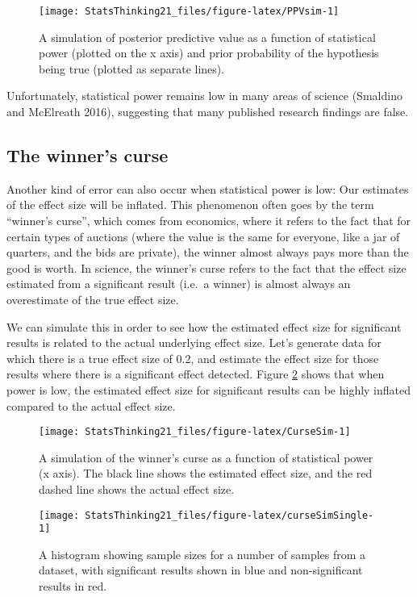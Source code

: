 \documentclass[]{book}
\theoremstyle{definition}
\theoremstyle{definition}
\theoremstyle{definition}
\theoremstyle{remark}
\begin{document}
\begin{figure}
\texttt{[image: StatsThinking21\_files/figure-latex/PPVsim-1]} \caption{A simulation of posterior predictive value as a function of statistical power (plotted on the x axis) and prior probability of the hypothesis being true (plotted as separate lines).}\label{fig:PPVsim}
\end{figure}

Unfortunately, statistical power remains low in many areas of science
(Smaldino and McElreath 2016), suggesting that many published research
findings are false.

\subsection{The winner's curse}\label{the-winners-curse}

Another kind of error can also occur when statistical power is low: Our
estimates of the effect size will be inflated. This phenomenon often
goes by the term ``winner's curse'', which comes from economics, where
it refers to the fact that for certain types of auctions (where the
value is the same for everyone, like a jar of quarters, and the bids are
private), the winner almost always pays more than the good is worth. In
science, the winner's curse refers to the fact that the effect size
estimated from a significant result (i.e.~a winner) is almost always an
overestimate of the true effect size.

We can simulate this in order to see how the estimated effect size for
significant results is related to the actual underlying effect size.
Let's generate data for which there is a true effect size of 0.2, and
estimate the effect size for those results where there is a significant
effect detected. Figure \ref{fig:CurseSim} shows that when power is low,
the estimated effect size for significant results can be highly inflated
compared to the actual effect size.

\begin{figure}
\texttt{[image: StatsThinking21\_files/figure-latex/CurseSim-1]} \caption{A simulation of the winner's curse as a function of statistical power (x axis). The black line shows the estimated effect size, and the red dashed line shows the actual effect size. }\label{fig:CurseSim}
\end{figure}

\begin{figure}
\texttt{[image: StatsThinking21\_files/figure-latex/curseSimSingle-1]} \caption{A histogram showing sample sizes for a number of samples from a dataset, with significant results shown in blue and non-significant results in red.}\label{fig:curseSimSingle}
\end{figure}
\end{document}

